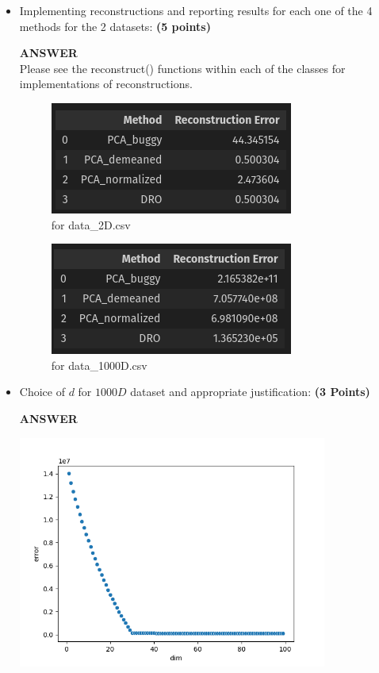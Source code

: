 \documentclass[a4paper]{article}
\theoremstyle{definition}
\begin{document}
\begin{itemize}
\begin{itemize}
\newpage
\item Implementing reconstructions and reporting results for each one of the 4 methods for the 2 datasets: \textbf{(5 points)}

\textbf{ANSWER}
\\
Please see the reconstruct() functions within each of the classes for implementations of reconstructions.

\begin{figure}
    \centering
    \includegraphics[width=0.5\linewidth]{recon_error_2D.png}
    \caption{for data_2D.csv}
    \label{fig:enter-label}
\end{figure}

\begin{figure}
    \centering
    \includegraphics[width=0.5\linewidth]{recon_error_1000D.png}
    \caption{for data_1000D.csv}
    \label{fig:enter-label}
\end{figure}


\item Choice of $d$ for $1000D$ dataset and appropriate justification:
\textbf{(3 Points)}

\textbf{ANSWER}

\includegraphics[width=4in]{hw5/choice_of_d.png} \\


\end{itemize}
\end{itemize}
\end{document}
